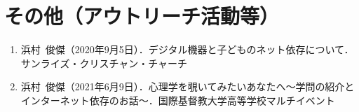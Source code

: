 \documentclass{article}
\begin{document}
\section{その他（アウトリーチ活動等）}
\begin{enumerate}
	\item 浜村\ 俊傑（2020年9月5日）．デジタル機器と子どものネット依存について．サンライズ・クリスチャン・チャーチ
	\item 浜村\ 俊傑（2021年6月9日）．心理学を覗いてみたいあなたへ〜学問の紹介とインターネット依存のお話〜．国際基督教大学高等学校マルチイベント
\end{enumerate}

\end{document}
